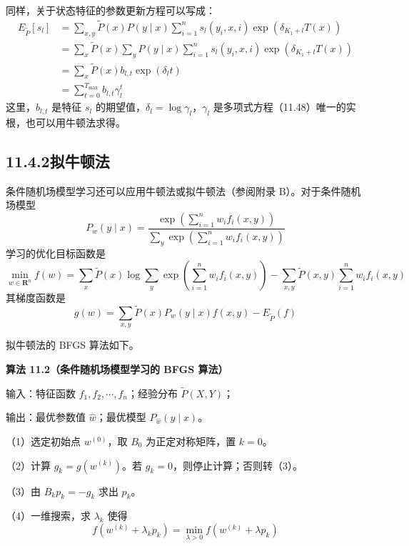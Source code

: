 \documentclass[UTF8, 12pt, fontset=fandol, oneside]{ctexart}
\begin{document}
同样，关于状态特征的参数更新方程可以写成：
\begin{equation}
\begin{aligned}
E_{\tilde P}[s_l]
&=\sum_{x,y}\tilde P(x)P(y\mid x)\sum_{i=1}^{n}s_l(y_i,x,i)\exp(\delta_{K_1+l}T(x))\\
&=\sum_x\tilde P(x)\sum_yP(y\mid x)\sum_{i=1}^{n}s_l(y_i,x,i)\exp(\delta_{K_1+l}T(x))\\
&=\sum_x\tilde P(x)b_{l,t}\exp(\delta_lt)\\
&=\sum_{t=0}^{T_{\max}}b_{l,t}\gamma_l^t
\end{aligned}
\tag{11.48}
\end{equation}
这里，$b_{l,t}$ 是特征 $s_l$ 的期望值，$\delta_l=\log\gamma_l$，$\gamma_l$ 是多项式方程（11.48）唯一的实根，也可以用牛顿法求得。

\subsection*{11.4.2\quad 拟牛顿法}

条件随机场模型学习还可以应用牛顿法或拟牛顿法（参阅附录 B）。对于条件随机场模型
\begin{equation}
P_w(y\mid x)=
\frac{
\exp\left(\sum_{i=1}^{n}w_if_i(x,y)\right)
}{
\sum_y\exp\left(\sum_{i=1}^{n}w_if_i(x,y)\right)
}
\tag{11.49}
\end{equation}
学习的优化目标函数是
\begin{equation}
\min_{w\in\mathbf R^n}f(w)=
\sum_x\tilde P(x)\log\sum_y\exp\left(\sum_{i=1}^{n}w_if_i(x,y)\right)
-\sum_{x,y}\tilde P(x,y)\sum_{i=1}^{n}w_if_i(x,y)
\tag{11.50}
\end{equation}
其梯度函数是
\begin{equation}
g(w)=\sum_{x,y}\tilde P(x)P_w(y\mid x)f(x,y)-E_{\tilde P}(f)
\tag{11.51}
\end{equation}

拟牛顿法的 BFGS 算法如下。

\noindent\textbf{算法 11.2（条件随机场模型学习的 BFGS 算法）}

输入：特征函数 $f_1,f_2,\cdots,f_n$；经验分布 $\tilde P(X,Y)$；

输出：最优参数值 $\hat w$；最优模型 $P_{\hat w}(y\mid x)$。

（1）选定初始点 $w^{(0)}$，取 $B_0$ 为正定对称矩阵，置 $k=0$。

（2）计算 $g_k=g(w^{(k)})$。若 $g_k=0$，则停止计算；否则转（3）。

（3）由 $B_kp_k=-g_k$ 求出 $p_k$。

（4）一维搜索，求 $\lambda_k$ 使得
\[
f(w^{(k)}+\lambda_kp_k)=\min_{\lambda>0}f(w^{(k)}+\lambda p_k)
\]
\end{document}
